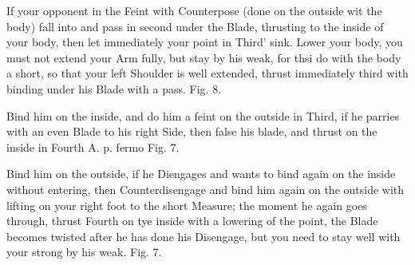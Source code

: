 \newpage


\newpage

\exercise{}
If your opponent in the Feint with Counterpose (done on the outside
wit the body) fall into and pass in second under the Blade, thrusting
to the inside of your body, then let immediately your point in Third'
sink. Lower your body, you must not extend your Arm fully, but stay by
his weak, for thsi do with the body a short, so that your left
Shoulder is well extended, thrust immediately third with binding under
his Blade with a pass. Fig. 8.

Bind him on the inside, and do him a feint on the outside in Third, if
he parries with an even Blade to his right Side, then
false his blade, and thrust on the inside in Fourth A. p. fermo
Fig. 7.

\exercise{}
Bind him on the outside, if he Diengages and wants to bind again on
the inside without entering, then Counterdisengage and bind him again
on the outside with lifting on your right foot to the short Measure;
the moment he again goes through, thrust Fourth on tye inside with a
lowering of the point, the Blade becomes twisted after he has done his
Disengage, but you need to stay well with your strong by his
weak. Fig. 7.

